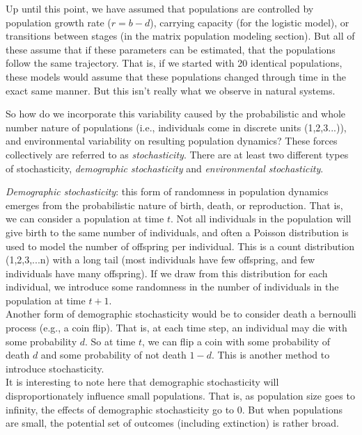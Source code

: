 \documentclass[12pt]{article}
\begin{document}
Up until this point, we have assumed that populations are controlled by population growth rate ($r=b-d$), carrying capacity (for the logistic model), or transitions between stages (in the matrix population modeling section). But all of these assume that if these parameters can be estimated, that the populations follow the same trajectory. That is, if we started with 20 identical populations, these models would assume that these populations changed through time in the exact same manner. But this isn't really what we observe in natural systems. 


So how do we incorporate this variability caused by the probabilistic and whole number nature of populations (i.e., individuals come in discrete units (1,2,3...)), and environmental variability on resulting population dynamics? These forces collectively are referred to as \textit{stochasticity}. There are at least two different types of stochasticity, \textit{demographic stochasticity} and 
\textit{environmental stochasticity}. 







\bigskip

\textit{Demographic stochasticity}: this form of randomness in population dynamics emerges from the probabilistic nature of birth, death, or reproduction. That is, we can consider a population at time $t$. Not all individuals in the population will give birth to the same number of individuals, and often a Poisson distribution is used to model the number of offspring per individual. This is a count distribution (1,2,3,...n) with a long tail (most individuals have few offspring, and few individuals have many offspring). If we draw from this distribution for each individual, we introduce some randomness in the number of individuals in the population at time $t+1$.  \\

Another form of demographic stochasticity would be to consider death a bernoulli process (e.g., a coin flip). That is, at each time step, an individual may die with some probability $d$. So at time $t$, we can flip a coin with some probability of death $d$ and some probability of not death $1-d$. This is another method to introduce stochasticity. \\

It is interesting to note here that demographic stochasticity will disproportionately influence small populations. That is, as population size goes to infinity, the effects of demographic stochasticity go to 0. But when populations are small, the potential set of outcomes (including extinction) is rather broad. 
\end{document}
